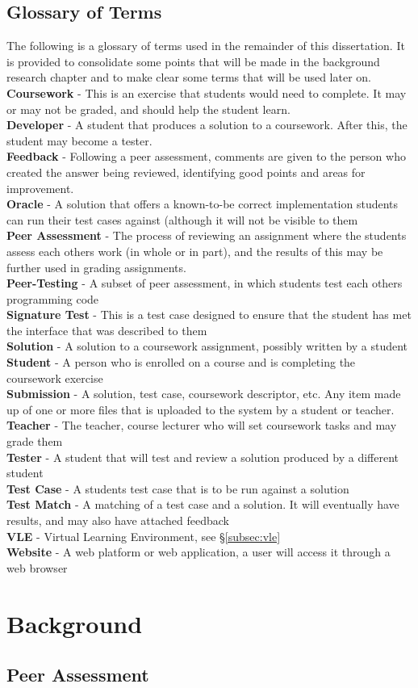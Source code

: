 \documentclass[a4paper,11pt]{report}
\newcommand{\gloss}[2]{\\\textbf{#1} - {#2}}
\begin{document}
\section{Glossary of Terms}
The following is a glossary of terms used in the remainder of this dissertation. It is provided to consolidate some points that will be made in the background research chapter and to make clear some terms that will be used later on.
\gloss{Coursework}{This is an exercise that students would need to complete. It may or may not be graded, and should help the student learn.}
\gloss{Developer}{A student that produces a solution to a coursework. After this, the student may become a tester.}
\gloss{Feedback}{Following a peer assessment, comments are given to the person who created the answer being reviewed, identifying good points and areas for improvement.}
\gloss{Oracle}{A solution that offers a known-to-be correct implementation students can run their test cases against (although it will not be visible to them}
\gloss{Peer Assessment}{The process of reviewing an assignment where the students assess each others work (in whole or in part), and the results of this may be further used in grading assignments.}
\gloss{Peer-Testing}{A subset of peer assessment, in which students test each others programming code}
\gloss{Signature Test}{This is a test case designed to ensure that the student has met the interface that was described to them}
\gloss{Solution}{A solution to a coursework assignment, possibly written by a student}
\gloss{Student}{A person who is enrolled on a course and is completing the coursework exercise}
\gloss{Submission}{A solution, test case, coursework descriptor, etc. Any item made up of one or more files that is uploaded to the system by a student or teacher.}
\gloss{Teacher}{The teacher, course lecturer who will set coursework tasks and may grade them}
\gloss{Tester}{A student that will test and review a solution produced by a different student}
\gloss{Test Case}{A students test case that is to be run against a solution}
\gloss{Test Match}{A matching of a test case and a solution. It will eventually have results, and may also have attached feedback}
\gloss{VLE}{Virtual Learning Environment, see \S\ref{subsec:vle}}
\gloss{Website}{A web platform or web application, a user will access it through a web browser}


\chapter{Background}
\label{ch:bg}
\section{Peer Assessment}
\end{document}
